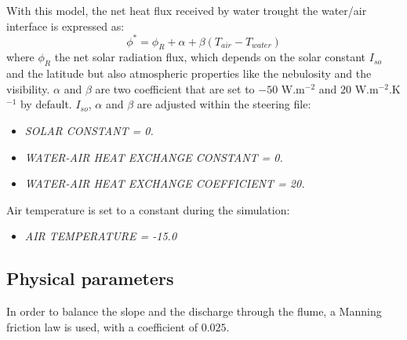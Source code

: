 With this model, the net heat flux received by water trought the water/air interface is expressed as:
\begin{equation}
\phi^* = \phi_R + \alpha + \beta (T_{air} - T_{water})
\end{equation}
where $\phi_R$ the net solar radiation flux, which depends on the solar constant $I_{so}$ and the latitude but
also atmospheric properties like the nebulosity and the visibility. $\alpha$ and $\beta$ are two coefficient that
are set to $-50$ W.m$^{-2}$ and $20$ W.m$^{-2}$.K$^{-1}$ by default. $I_{so}$, $\alpha$ and $\beta$ are adjusted within
the \khione steering file:
\begin{itemize}
	\item\textit{SOLAR CONSTANT = 0.}
	\item\textit{WATER-AIR HEAT EXCHANGE CONSTANT = 0.}
	\item\textit{WATER-AIR HEAT EXCHANGE COEFFICIENT = 20.}
\end{itemize}
Air temperature is set to a constant during the simulation:
\begin{itemize}
	\item\textit{AIR TEMPERATURE      = -15.0}
\end{itemize}

\subsection{Physical parameters}

In order to balance the slope and the discharge through the flume, a Manning friction law is used, with a coefficient of $0.025$.

